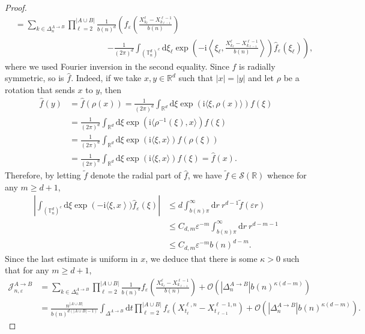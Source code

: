 \documentclass[12pt]{article}
\newcommand{\RR}{\mathbb R}
\newcommand{\TT}{\mathbb T}
\newcommand{\1}{\mathds{1}}
\renewcommand{\d}{\mathrm d}
\renewcommand{\i}{\mathrm i}
\numberwithin{equation}{section}
\begin{document}
\begin{proof}
\begin{align*}
        &=\sum_{k\in\Delta_n^{A\rightarrow B}}\prod_{\ell=2}^{|A\cup B|}\frac{1}{b(n)^d}\left(f_\varepsilon\left(\frac{X_{k_\ell}^{\ell}-X_{k_{\ell-1}}^{{\ell-1}}}{b(n)}\right)\right.\\
        &\quad\quad \quad\quad\quad\quad\quad\quad\quad\quad\quad\left.-\frac{1}{(2\pi)^d}\int_{(\TT_n^d)^c}\d\xi_\ell\exp\left(-\i\left\langle\xi_\ell,\frac{X_{k_\ell}^{\ell}-X_{k_{\ell-1}}^{{\ell-1}}}{b(n)}\right\rangle\right)\hat f_\varepsilon(\xi_\ell)\right),
    \end{align*}
    where we used Fourier inversion in the second equality. Since $f$ is radially symmetric, so is $\hat f$. Indeed, if we take $x,y\in\RR^d$ such that $|x|=|y|$ and let $\rho$ be a rotation that sends $x$ to $y$, then
    \begin{align*}
        \hat f(y)&=\hat f(\rho(x))=\frac{1}{(2\pi)^d}\int_{\RR^d}\d\xi\exp(\i\langle\xi,\rho(x)\rangle)f(\xi)\\
        &=\frac{1}{(2\pi)^d}\int_{\RR^d}\d\xi\exp(\i\langle\rho^{-1}(\xi),x\rangle)f(\xi)\\
        &=\frac{1}{(2\pi)^d}\int_{\RR^d}\d\xi\exp(\i\langle\xi,x\rangle)f(\rho(\xi))\\
        &=\frac{1}{(2\pi)^d}\int_{\RR^d}\d\xi\exp(\i\langle\xi,x\rangle)f(\xi)=\hat f(x).
    \end{align*}
    Therefore, by letting $\widetilde f$ denote the radial part of $\hat f$, we have $\widetilde f\in\mathcal S(\RR)$ whence for any $m\ge d+1$,
    \begin{align*}
        \left|\int_{(\TT_n^d)^c}\d\xi\exp\left(-\i\langle \xi,x\right\rangle)\hat f_\varepsilon(\xi)\right|&\le {d}\int_{b(n)\pi}^\infty\d r\ r^{d-1}\widetilde f(\varepsilon r)\\
        &\le C_{d,m}\varepsilon^{-m}\int_{b(n)\pi}^\infty\d r\ r^{d-m-1}\\
        &\le C_{d,m}\varepsilon^{-m}b(n)^{d-m}.
    \end{align*}
    Since the last estimate is uniform in $x$, we deduce that there is some $\kappa>0$ such that for any $m\ge d+1$,
    \begin{align*}
        \mathcal J_{n,\varepsilon}^{A\rightarrow B}&=\sum_{k\in\Delta_n^{A\rightarrow B}}\prod_{\ell=2}^{|A\cup B|}\frac{1}{b(n)^d}f_\varepsilon\left(\frac{X_{k_\ell}^{\ell}-X_{k_{\ell-1}}^{{\ell-1}}}{b(n)}\right)+\mathcal O\left(|\Delta_n^{A\rightarrow B}|b(n)^{\kappa(d-m)}\right)\\
        &=\frac{n^{|A\cup B|}}{b(n)^{d(|A\cup B|-1)}}\int_{\Delta^{A\rightarrow B}}\d t\prod_{\ell=2}^{|A\cup B|}f_\varepsilon\left(X_{t_\ell}^{\ell,n}-X_{t_{\ell-1}}^{\ell-1,n}\right)+\mathcal O\left(|\Delta_n^{A\rightarrow B}|b(n)^{\kappa(d-m)}\right).

\end{align*}
\end{proof}
\end{document}
